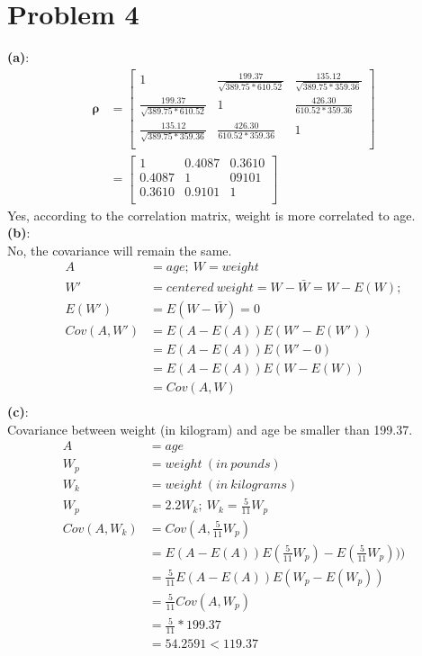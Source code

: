 \documentclass[11pt]{scrartcl}
\begin{document}
\section*{Problem 4}
\textbf{(a)}:\\
\begin{equation*}
\begin{aligned}
\mathbf{\rho}
&=
\begin{bmatrix} 
1 & \frac{199.37}{\sqrt{389.75*610.52}} & \frac{135.12}{\sqrt{389.75*359.36}} \\ 
\frac{199.37}{\sqrt{389.75*610.52}}  & 1 & \frac{426.30}{610.52*359.36} \\ 
 \frac{135.12}{\sqrt{389.75*359.36}}  & \frac{426.30}{610.52*359.36}  &1 \\
\end{bmatrix} \\
&=
\begin{bmatrix} 
1 &  0.4087 &  0.3610 \\ 
0.4087 & 1 & 09101  \\ 
 0.3610 & 0.9101  &1 \\
\end{bmatrix} 
\end{aligned}
\end{equation*}
Yes, according to the correlation matrix, weight is more correlated to age.\\
\textbf{(b)}:\\
No, the covariance will remain the same. 
\begin{equation*}
\begin{aligned}
A&=age;\  
W=weight\\
W'&=centered\ weight=W-\bar{W}=W-E(W);\\
E(W')&=E(W-\bar{W})=0\\
Cov(A,W')&=E(A-E(A))E(W'-E(W'))\\
&=E(A-E(A))E(W'-0)\\
&=E(A-E(A))E(W-E(W))\\
&=Cov(A,W)\\
\end{aligned}
\end{equation*}
\textbf{(c)}:\\
Covariance between weight (in kilogram) and age be smaller than 199.37.
\begin{equation*}
\begin{aligned}
A&=age\\
W_p&=weight \ (in\ pounds)\\
W_k&=weight \ (in\ kilograms)\\
W_p&=2.2W_k; \  W_k=\frac{5}{11} W_p\\
Cov (A,W_k)
&=Cov(A,\frac{5}{11} W_p)\\
&=E(A-E(A))E(\frac{5}{11} W_p)-E(\frac{5}{11} W_p)))\\
&=\frac{5}{11} E(A-E(A))E( W_p-E(W_p))\\
&=\frac{5}{11} Cov(A,W_p)\\
&=\frac{5}{11} *199.37\\
&=54.2591 < 119.37\\
\end{aligned}
\end{equation*}
\end{document}
